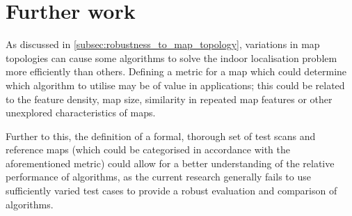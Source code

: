 \documentclass[authoryearcitations]{UoYCSproject}
\begin{document}
\section{Further work}
\label{sec:further_work}
As discussed in \autoref{subsec:robustness_to_map_topology}, variations in map topologies can cause some algorithms to solve the indoor localisation problem more efficiently than others. Defining a metric for a map which could determine which algorithm to utilise may be of value in applications; this could be related to the feature density, map size, similarity in repeated map features or other unexplored characteristics of maps. 

Further to this, the definition of a formal, thorough set of test scans and reference maps (which could be categorised in accordance with the aforementioned metric) could allow for a better understanding of the relative performance of algorithms, as the current research generally fails to use sufficiently varied test cases to provide a robust evaluation and comparison of algorithms.

\clearpage


\end{document}
